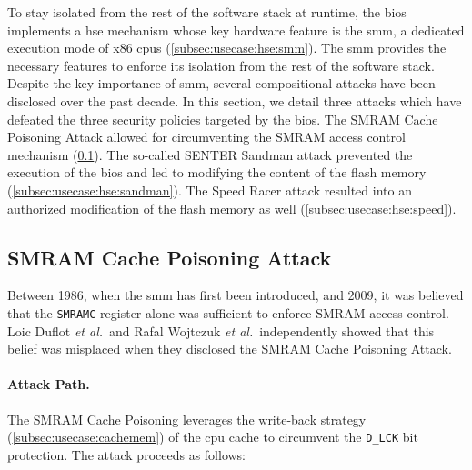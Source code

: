 To stay isolated from the rest of the software stack at runtime, the \ac{bios}
implements a \ac{hse} mechanism whose key hardware feature is the \ac{smm}, a
dedicated execution mode of x86 \acp{cpu} (\ref{subsec:usecase:hse:smm}).
%
The \ac{smm} provides the necessary features to enforce its isolation from the
rest of the software stack.
%
Despite the key importance of \ac{smm}, several compositional attacks have been
disclosed over the past decade.
%
In this section, we detail three attacks which have defeated the three security
policies targeted by the \ac{bios}.
%
The SMRAM Cache Poisoning Attack allowed for circumventing the SMRAM access
control mechanism (\ref{subsec:usecase:hse:smram}).
%
The so-called SENTER Sandman attack prevented the execution of the \ac{bios} and
led to modifying the content of the flash memory
(\ref{subsec:usecase:hse:sandman}).
%
The Speed Racer attack resulted into an authorized modification of the flash
memory as well (\ref{subsec:usecase:hse:speed}).

\subsection{SMRAM Cache Poisoning Attack}
\label{subsec:usecase:hse:smram}

Between 1986, when the \ac{smm} has first been introduced, and 2009, it was
believed that the \texttt{SMRAMC} register alone was sufficient to enforce SMRAM
access control.
%
Loic Duflot \emph{et al.}\,\cite{duflot2009smram} and Rafal Wojtczuk \emph{et
  al.}\,\cite{wojtczuk2009smram} independently showed that this belief was
misplaced when they disclosed the SMRAM Cache Poisoning Attack.

\paragraph{Attack Path.}
%
The SMRAM Cache Poisoning leverages the write-back strategy
(\ref{subsec:usecase:cachemem}) of the \ac{cpu} cache to circumvent the
\texttt{D\_LCK} bit protection.
%
The attack proceeds as follows:

